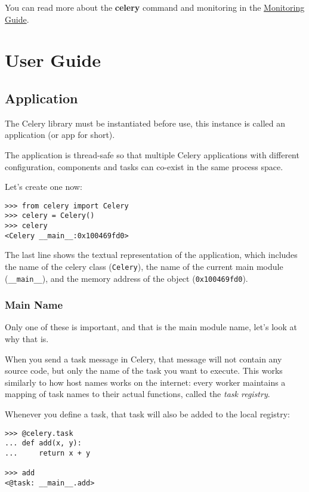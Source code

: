 \documentclass[9pt,a4paper]{article}
\begin{document}
\begin{CJK*}{GBK}{kai}
You can read more about the \textbf{celery} command and monitoring in the \href{http://docs.celeryproject.org/en/latest/userguide/monitoring.html#guide-monitoring}{Monitoring Guide}.


\section{User Guide}

\subsection{Application}
The Celery library must be instantiated before use, this instance is called an application (or app for short).

The application is thread-safe so that multiple Celery applications with different configuration, components and tasks can co-exist in the same process space.

Let’s create one now:

\begin{Verbatim}[frame=single]
>>> from celery import Celery
>>> celery = Celery()
>>> celery
<Celery __main__:0x100469fd0>
\end{Verbatim}

The last line shows the textual representation of the application, which includes the name of the celery class (\verb"Celery"), the name of the current main module (\verb"__main__"), and the memory address of the object (\verb"0x100469fd0").

\subsubsection{Main Name}
Only one of these is important, and that is the main module name, let\textquoteright s look at why that is.

When you send a task message in Celery, that message will not contain any source code, but only the name of the task you want to execute. This works similarly to how host names works on the internet: every worker maintains a mapping of task names to their actual functions, called the \textit{task registry}.

Whenever you define a task, that task will also be added to the local registry:

\begin{Verbatim}[frame=single]
>>> @celery.task
... def add(x, y):
...     return x + y

>>> add
<@task: __main__.add>


\end{Verbatim}
\end{CJK*}
\end{document}

